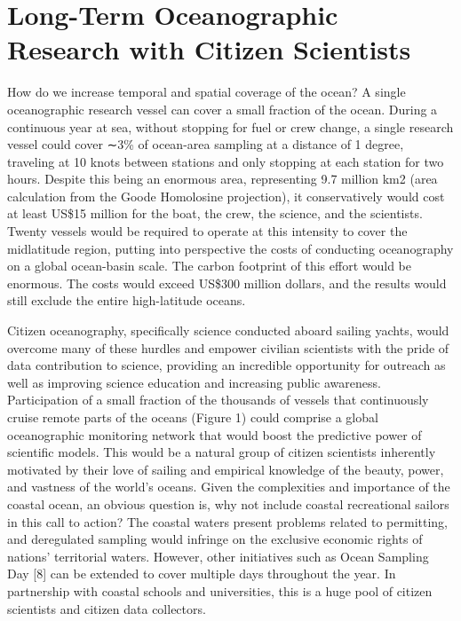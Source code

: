 \section{Long-Term Oceanographic Research with Citizen Scientists}

How do we increase temporal and spatial coverage of the ocean? A single oceanographic research vessel can cover a small fraction of the ocean. During a continuous year at sea, without stopping for fuel or crew change, a single research vessel could cover ∼3\% of ocean-area sampling at a distance of 1 degree, traveling at 10 knots between stations and only stopping at each station for two hours. Despite this being an enormous area, representing 9.7 million km2 (area calculation from the Goode Homolosine projection), it conservatively would cost at least US\$15 million for the boat, the crew, the science, and the scientists. Twenty vessels would be required to operate at this intensity to cover the midlatitude region, putting into perspective the costs of conducting oceanography on a global ocean-basin scale. The carbon footprint of this effort would be enormous. The costs would exceed US\$300 million dollars, and the results would still exclude the entire high-latitude oceans.

Citizen oceanography, specifically science conducted aboard sailing yachts, would overcome many of these hurdles and empower civilian scientists with the pride of data contribution to science, providing an incredible opportunity for outreach as well as improving science education and increasing public awareness. Participation of a small fraction of the thousands of vessels that continuously cruise remote parts of the oceans (Figure 1) could comprise a global oceanographic monitoring network that would boost the predictive power of scientific models. This would be a natural group of citizen scientists inherently motivated by their love of sailing and empirical knowledge of the beauty, power, and vastness of the world's oceans. Given the complexities and importance of the coastal ocean, an obvious question is, why not include coastal recreational sailors in this call to action? The coastal waters present problems related to permitting, and deregulated sampling would infringe on the exclusive economic rights of nations' territorial waters. However, other initiatives such as Ocean Sampling Day [8] can be extended to cover multiple days throughout the year. In partnership with coastal schools and universities, this is a huge pool of citizen scientists and citizen data collectors.

